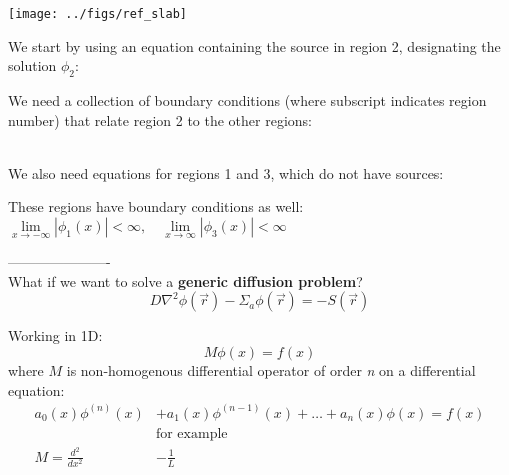 \documentclass[12pt]{article}
\newif\ifeqns
\newcommand{\rvec}{\ensuremath{\vec{r}}}
\begin{document}
\begin{center}
\texttt{[image: ../figs/ref\_slab]}
\end{center}

We start by using an equation containing the source in region 2, designating the solution $\phi_2$:
\ifeqns
\begin{equation*}
\frac{d^2\phi_2(x)}{dx_2^2} - \frac{1}{L_2^2}\phi_2(x) = -\frac{S_0}{D_2}, \quad -\tfrac{a}{2}<x<\tfrac{a}{2}
\end{equation*}
\else
\vspace*{3em}
\fi

We need a collection of boundary conditions (where subscript indicates region number) that relate region 2 to the other regions:
\ifeqns
\begin{gather*}
\phi_2(\tfrac{a}{2}) = \phi_3(\tfrac{a}{2}) \\
\vec{J}_2(\tfrac{a}{2}) = \vec{J}_3(\tfrac{a}{2}) \\
\phi_1(-\tfrac{a}{2}) = \phi_2(-\tfrac{a}{2}) \\
\vec{J}_1(-\tfrac{a}{2}) = \vec{J}_3(-\tfrac{a}{2}) 
\end{gather*}
\else
\vspace*{12em}\\
\fi
We also need equations for regions 1 and 3, which do not have sources:
\ifeqns
\begin{align*}
\frac{d^2\phi_1(x)}{dx_1^2} &- \frac{1}{L_1^2}\phi_1(x) = 0, \quad -\infty<x<-\tfrac{a}{2}\\
%
\frac{d^2\phi_3(x)}{dx_3^2} &- \frac{1}{L_3^2}\phi_3(x) = 0, \quad \tfrac{a}{2}<x<\infty
\end{align*}
\else
\vspace*{8em}
\fi

These regions have boundary conditions as well: 
$\lim\limits_{x\to-\infty}|\phi_1(x)| <\infty, \quad \lim\limits_{x\to\infty}|\phi_3(x)| < \infty$

----------------------\\
What if we want to solve a \textbf{generic diffusion problem}?
%
\begin{equation*}
D\nabla^2\phi(\rvec) - \Sigma_a\phi(\rvec) = -S(\rvec)
\end{equation*}

Working in 1D:
\begin{equation*}
M\phi(x) = f(x)
\end{equation*}
%
where $M$ is non-homogenous differential operator of order \emph{n} on a differential equation:
%
\begin{align*}
a_0(x)\phi^{(n)}(x) &+ a_1(x)\phi^{(n-1)}(x) + \dotsc + a_n(x)\phi(x) = f(x)\\
&\text{for example}\\
M = \frac{d^2}{dx^2} &- \frac{1}{L}
\end{align*}
\end{document}
